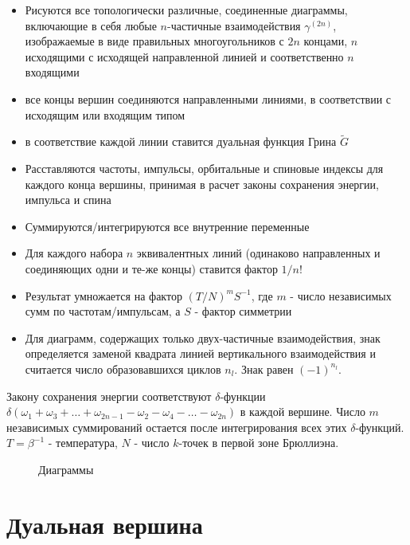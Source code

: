 \documentclass[11pt,a4paper]{report}
\begin{document}
\begin{itemize}
 \label{rules}
 \item Рисуются все топологически различные, соединенные диаграммы, включающие в себя любые $n$-частичные взаимодействия $\gamma^{(2n)}$, изображаемые в виде правильных многоугольников с $2n$ концами, 
 $n$ исходящими с исходящей направленной линией и соответственно $n$ входящими
 \item все концы вершин соединяются направленными линиями, в соответствии с исходящим или входящим типом
 \item в соответствие каждой линии ставится дуальная функция Грина $\tilde{G}$
 \item Расставляются частоты, импульсы, орбитальные и спиновые индексы для каждого конца вершины, принимая в расчет законы сохранения энергии, импульса и спина
 \item Суммируются/интегрируются все внутренние переменные
 \item Для каждого набора $n$ эквивалентных линий (одинаково направленных и соединяющих одни и те-же концы) ставится фактор $1/n!$
 \item Результат умножается на фактор $(T/N)^m S^{-1}$, где $m$ - число независимых сумм по частотам/импульсам, а $S$ - фактор симметрии\cite{negele1998quantum}
 \item Для диаграмм, содержащих только двух-частичные взаимодействия, знак определяется заменой квадрата линией вертикального взаимодействия и считается число образовавшихся циклов $n_l$. Знак равен $(-1)^{n_l}$.
\end{itemize}
 
Закону сохранения энергии соответствуют $\delta$-функции $\delta(\omega_1+\omega_3+\dots+\omega_{2n-1}-\omega_2-\omega_4-\dots-\omega_{2n})$ в каждой вершине.
Число $m$ независимых суммирований остается после интегрирования всех этих $\delta$-функций. $T = \beta^{-1}$ - температура, $N$ - число $k$-точек в первой зоне Брюллиэна.
 
\begin{figure}[H]
\label{diags}
\centering
\subfigure[\label{fig:diag0}]{\diagzero}
\subfigure[]{\diagtwoG}
\subfigure[]{\diagthreeGempty}
\subfigure[]{\begin{tikzpicture}[baseline=-35pt]{\node{\diagsixempty};}\end{tikzpicture}}
\caption{Диаграммы}
\end{figure}

\section{Дуальная вершина}
\end{document}
